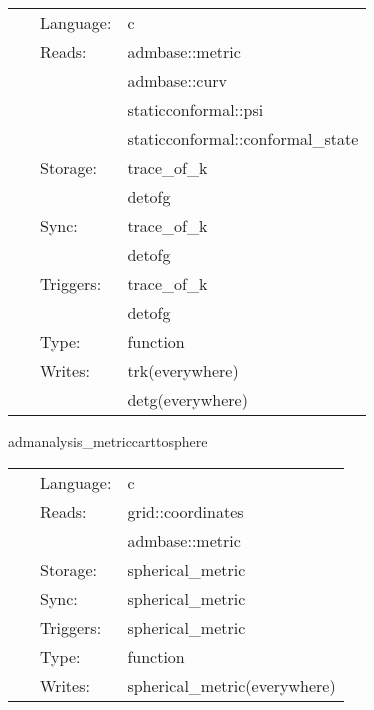 \documentclass{article}
\begin{document}
\hspace{5mm}

 \begin{tabular*}{160mm}{cll} 
~ & Language:  & c \\ 
~ & Reads:  & admbase::metric \\ 
~& ~ &admbase::curv\\ 
~& ~ &staticconformal::psi\\ 
~& ~ &staticconformal::conformal\_state\\ 
~ & Storage:  & trace\_of\_k \\ 
~& ~ &detofg\\ 
~ & Sync:  & trace\_of\_k \\ 
~& ~ &detofg\\ 
~ & Triggers:  & trace\_of\_k \\ 
~& ~ &detofg\\ 
~ & Type:  & function \\ 
~ & Writes:  & trk(everywhere) \\ 
~& ~ &detg(everywhere)\\ 
\end{tabular*} 


\vspace{5mm}


\hspace{5mm} admanalysis\_metriccarttosphere 

\hspace{5mm}{\it calculate the spherical metric in r,theta(q), phi(p) } 


\hspace{5mm}

 \begin{tabular*}{160mm}{cll} 
~ & Language:  & c \\ 
~ & Reads:  & grid::coordinates \\ 
~& ~ &admbase::metric\\ 
~ & Storage:  & spherical\_metric \\ 
~ & Sync:  & spherical\_metric \\ 
~ & Triggers:  & spherical\_metric \\ 
~ & Type:  & function \\ 
~ & Writes:  & spherical\_metric(everywhere) \\ 
\end{tabular*} 


\vspace{5mm}
\end{document}
